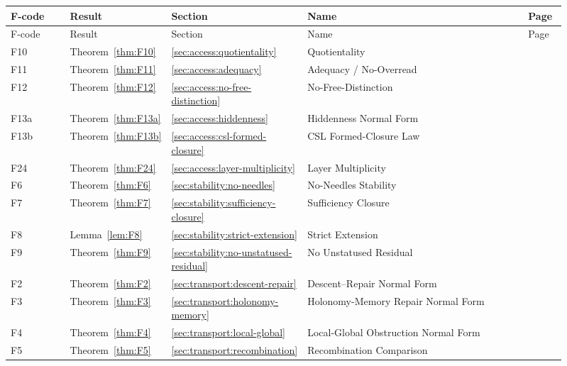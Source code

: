 \begingroup\small
\setlength{\tabcolsep}{3pt}
\begin{longtable}{@{}>{\raggedright\arraybackslash}p{0.12\linewidth}>{\raggedright\arraybackslash}p{0.17\linewidth}>{\raggedright\arraybackslash}p{0.08\linewidth}>{\raggedright\arraybackslash}p{0.47\linewidth}>{\raggedright\arraybackslash}p{0.07\linewidth}@{}}
\toprule
F-code & Result & Section & Name & Page \\
\midrule
\endfirsthead
\toprule
F-code & Result & Section & Name & Page \\
\midrule
\endhead
\bottomrule
\endfoot
F10 & Theorem~\ref{thm:F10} & \ref{sec:access:quotientality} & Quotientality & \pageref{thm:F10} \\
F11 & Theorem~\ref{thm:F11} & \ref{sec:access:adequacy} & Adequacy / No-Overread & \pageref{thm:F11} \\
F12 & Theorem~\ref{thm:F12} & \ref{sec:access:no-free-distinction} & No-Free-Distinction & \pageref{thm:F12} \\
F13a & Theorem~\ref{thm:F13a} & \ref{sec:access:hiddenness} & Hiddenness Normal Form & \pageref{thm:F13a} \\
F13b & Theorem~\ref{thm:F13b} & \ref{sec:access:csl-formed-closure} & CSL Formed-Closure Law & \pageref{thm:F13b} \\
F24 & Theorem~\ref{thm:F24} & \ref{sec:access:layer-multiplicity} & Layer Multiplicity & \pageref{thm:F24} \\
F6 & Theorem~\ref{thm:F6} & \ref{sec:stability:no-needles} & No-Needles Stability & \pageref{thm:F6} \\
F7 & Theorem~\ref{thm:F7} & \ref{sec:stability:sufficiency-closure} & Sufficiency Closure & \pageref{thm:F7} \\
F8 & Lemma~\ref{lem:F8} & \ref{sec:stability:strict-extension} & Strict Extension & \pageref{lem:F8} \\
F9 & Theorem~\ref{thm:F9} & \ref{sec:stability:no-unstatused-residual} & No Unstatused Residual & \pageref{thm:F9} \\
F2 & Theorem~\ref{thm:F2} & \ref{sec:transport:descent-repair} & Descent--Repair Normal Form & \pageref{thm:F2} \\
F3 & Theorem~\ref{thm:F3} & \ref{sec:transport:holonomy-memory} & Holonomy-Memory Repair Normal Form & \pageref{thm:F3} \\
F4 & Theorem~\ref{thm:F4} & \ref{sec:transport:local-global} & Local-Global Obstruction Normal Form & \pageref{thm:F4} \\
F5 & Theorem~\ref{thm:F5} & \ref{sec:transport:recombination} & Recombination Comparison & \pageref{thm:F5} \\

\end{longtable}
